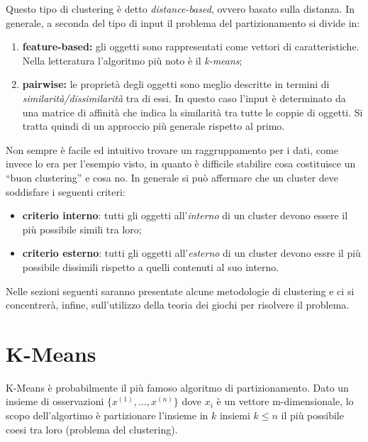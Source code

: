\newpage

Questo tipo di clustering è detto \emph{distance-based}, ovvero basato sulla distanza. In generale, a seconda del tipo di input il problema del partizionamento si divide in:
\begin{enumerate}
	\item \textbf{feature-based:} gli oggetti sono rappresentati come vettori di caratteristiche. Nella letteratura l'algoritmo più noto è il \emph{k-means};
	\item \textbf{pairwise:} le proprietà degli oggetti sono meglio descritte in termini di \emph{similarità/dissimilarità} tra di essi. In questo caso l'input è determinato da una matrice di affinità che indica la similarità tra tutte le coppie di oggetti. Si tratta quindi di un approccio più generale rispetto al primo.
\end{enumerate}

Non sempre è facile ed intuitivo trovare un raggruppamento per i dati, come invece lo era per l’esempio visto, in quanto è difficile stabilire cosa costituisce un “buon clustering” e cosa no. In generale si può affermare che un cluster deve soddisfare i seguenti criteri:
\begin{itemize}
	\item \textbf{criterio interno}: tutti gli oggetti all'\emph{interno} di un cluster devono essere il più possibile simili tra loro;
	\item \textbf{criterio esterno}: tutti gli oggetti all'\emph{esterno} di un cluster devono essre il più possibile dissimili rispetto a quelli contenuti al suo interno.
\end{itemize}

Nelle sezioni seguenti saranno presentate alcune metodologie di clustering e ci si concentrerà, infine, sull'utilizzo della teoria dei giochi per risolvere il problema.


\newpage

\section{K-Means} %
\label{sec:k_means}
K-Means è probabilmente il più famoso algoritmo di partizionamento. Dato un insieme di osservazioni $\{x^{(1)},\dots,x^{(n)} \}$ dove $x_i$ è un vettore m-dimensionale, lo scopo dell'algortimo è partizionare l'insieme in $k$ insiemi $k \leq n$ il più possibile coesi tra loro (problema del clustering).\\

